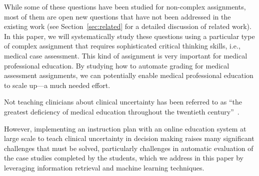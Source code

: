 While some of these questions have been studied for non-complex assignments, 
most of them are open new questions that have not been addressed in the existing work
(see Section~\ref{sec:related} for a detailed discussion of related work). 
In this paper, we will systematically study these questions using a particular type of complex
assignment that requires sophisticated critical thinking skills, i.e.,
medical case assessment. This kind of assignment is very important for
medical professional education. By studying how to automate grading
for medical assessment assignments, we can potentially enable medical
professional education to scale up---a much needed effort.
Not teaching clinicians about clinical uncertainty has been referred to as
``the greatest deficiency of medical education throughout the twentieth
century''~\cite{Djulbegovic:2004, Gambrill:2005}.
However, implementing an instruction plan with an online education system
at large scale to teach clinical uncertainty in decision making raises many
significant challenges that must be solved, particularly challenges in
automatic evaluation of the case studies completed by the students, which
we address in this paper by leveraging information retrieval and machine
learning techniques.

